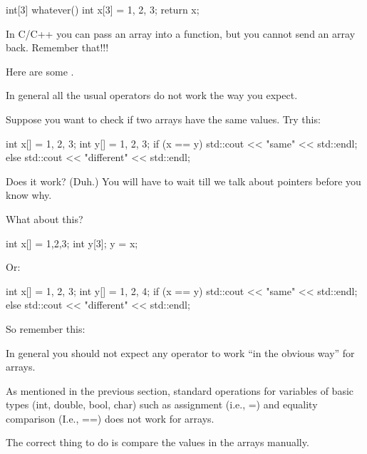 \begin{consolethree}[escapeinside=||]
int[3] whatever()
{
    int x[3] = {1, 2, 3};
    return x;
}
\end{consolethree}

In C/C++ you can pass an array into a function, but you cannot send an array back. Remember that!!!

\newpage{}

Here are some .

In general all the usual operators do not work the way you expect.

Suppose you want to check if two arrays have the same values. Try this:

\begin{consolethree}[escapeinside=||]
int x[] = {1, 2, 3};
int y[] = {1, 2, 3};
if (x == y)
{
    std::cout << "same" << std::endl;
}
else
{
    std::cout << "different" << std::endl;
}
\end{consolethree}

Does it work? (Duh.) You will have to wait till we talk about pointers before you know why.

What about this?

\begin{consolethree}[escapeinside=||]
int x[] = {1,2,3};
int y[3];
y = x;
\end{consolethree}

Or:

\begin{consolethree}[escapeinside=||]
int x[] = {1, 2, 3};
int y[] = {1, 2, 4};
if (x == y)
    std::cout << "same" << std::endl;
else
    std::cout << "different" << std::endl;
\end{consolethree}

So remember this: 

In general you should not expect any operator to work ``in the obvious way'' for arrays.

\newpage{}

As mentioned in the previous section, standard operations for variables of basic types (int, double, bool, char) such as assignment (i.e., =) and equality comparison (I.e., ==) does not work for arrays.

The correct thing to do is compare the values in the arrays manually.


